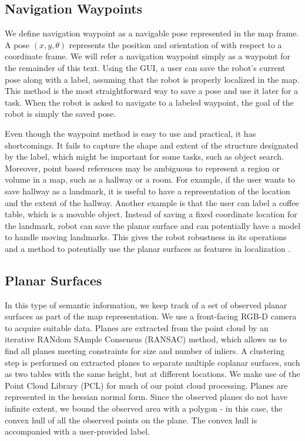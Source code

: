 \subsection{Navigation Waypoints}
\label{sec:map_waypoints}

We define navigation waypoint as a navigable pose represented in the map frame. A pose $(x,y,\theta)$ represents the position and orientation of with respect to a coordinate frame. We will refer a navigation waypoint simply as a waypoint for the remainder of this text. Using the GUI, a user can save the robot's current pose along with a label, assuming that the robot is properly localized in the map. This method is the most straightforward way to save a pose and use it later for a task. When the robot is asked to navigate to a labeled waypoint, the goal of the robot is simply the saved pose.

Even though the waypoint method is easy to use and practical, it has shortcomings. It fails to capture the shape and extent of the structure designated by the label, which might be important for some tasks, such as object search. Moreover, point based references may be ambiguous to represent a region or volume in a map, such as a hallway or a room. For example, if the user wants to save hallway as a landmark, it is useful to have a representation of the location and the extent of the hallway. Another example is that the user can label a coffee table, which is a movable object. Instead of saving a fixed coordinate location for the landmark, robot can save the planar surface and can potentially have a model to handle moving landmarks. This gives the robot robustness in its operations and a method to potentially use the planar surfaces as features in localization \cite{trevor2012planar}.

\subsection{Planar Surfaces}
\label{sec:map_landmarks}

In this type of semantic information, we keep track of a set of observed planar surfaces as part of the map representation. We use a front-facing RGB-D camera to acquire suitable data. Planes are extracted from the point cloud by an iterative RANdom SAmple Consensus (RANSAC) method, which allows us to find all planes meeting constraints for size and number of inliers. A clustering step is performed on extracted planes to separate multiple coplanar surfaces, such as two tables with the same height, but at different locations. We make use of the Point Cloud Library (PCL) \cite{rusu20113d} for much of our point cloud processing. Planes are represented in the hessian normal form. Since the observed planes do not have infinite extent, we bound the observed area with a polygon - in this case, the convex hull of all the observed points on the plane. The convex hull is accompanied with a user-provided label. 

